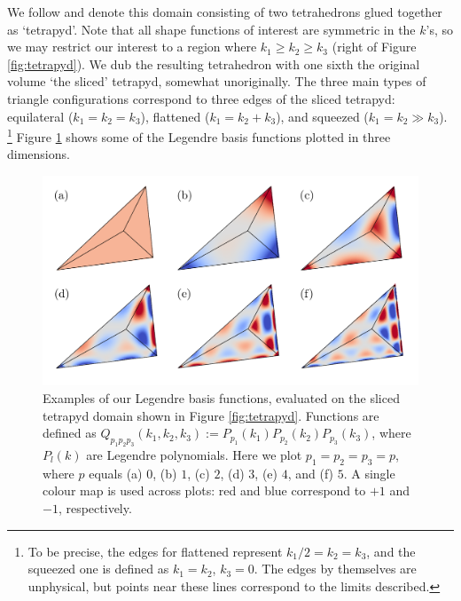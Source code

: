 We follow \cite{Fergusson2010general} and denote this domain consisting of two tetrahedrons glued together as `tetrapyd'. Note that all shape functions of interest are symmetric in the $k$'s, so we may restrict our interest to a region where $k_1 \ge k_2 \ge k_3$ (right of Figure \ref{fig:tetrapyd}). We dub the resulting tetrahedron with one sixth the original volume `the sliced' tetrapyd, somewhat unoriginally. The three main types of triangle configurations correspond to three edges of the sliced tetrapyd: equilateral ($k_1=k_2=k_3$), flattened ($k_1 = k_2 + k_3$), and squeezed ($k_1 = k_2 \gg k_3$). \footnote{To be precise, the edges for flattened represent $k_1/2 = k_2 = k_3$, and the squeezed one is defined as $k_1=k_2$, $k_3=0$. The edges by themselves are unphysical, but points near these lines correspond to the limits described.} Figure \ref{fig:Legendre_basis_functions_3D} shows some of the Legendre basis functions plotted in three dimensions.

\begin{figure}
	\centering    
	\includegraphics[width=1.0\textwidth]{legendre_modes_3D_final.pdf}
	\caption{Examples of our Legendre basis functions, evaluated on the sliced tetrapyd domain shown in Figure \ref{fig:tetrapyd}. Functions are defined as $Q_{p_1 p_2 p_3}(k_1,k_2,k_3) := P_{p_1}(k_1) P_{p_2}(k_2) P_{p_3}(k_3)$, where $P_l(k)$ are Legendre polynomials. Here we plot $p_1 = p_2 = p_3 = p$, where $p$ equals (a) $0$, (b) $1$, (c) $2$, (d) $3$, (e) $4$, and (f) $5$. A single colour map is used across plots: red and blue correspond to $+1$ and $-1$, respectively.}	
	\label{fig:Legendre_basis_functions_3D}
\end{figure}

